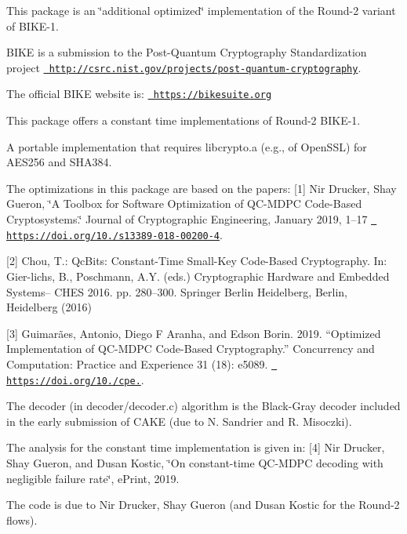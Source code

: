 This package is an \char`\"{}additional optimized\char`\"{} implementation of the Round-\/2 variant of BIKE-\/1.

BIKE is a submission to the Post-\/\+Quantum Cryptography Standardization project \href{http://csrc.nist.gov/projects/post-quantum-cryptography}{\texttt{ http\+://csrc.\+nist.\+gov/projects/post-\/quantum-\/cryptography}}.

The official BIKE website is\+: \href{https://bikesuite.org}{\texttt{ https\+://bikesuite.\+org}}

This package offers a constant time implementations of Round-\/2 BIKE-\/1.
\begin{DoxyItemize}
\item A portable implementation that requires libcrypto.\+a (e.\+g., of Open\+SSL) for AES256 and SHA384.
\end{DoxyItemize}

The optimizations in this package are based on the papers\+: \mbox{[}1\mbox{]} Nir Drucker, Shay Gueron, \char`\"{}\+A Toolbox for Software Optimization of QC-\/\+MDPC      Code-\/\+Based Cryptosystems.\char`\"{} Journal of Cryptographic Engineering, January 2019, 1–17 \href{https://doi.org/10.1007/s13389-018-00200-4}{\texttt{ https\+://doi.\+org/10./s13389-\/018-\/00200-\/4}}.

\mbox{[}2\mbox{]} Chou, T.\+: Qc\+Bits\+: Constant-\/\+Time Small-\/\+Key Code-\/\+Based Cryptography. In\+: Gier-\/lichs, B., Poschmann, A.\+Y. (eds.) Cryptographic Hardware and Embedded Systems– CHES 2016. pp. 280–300. Springer Berlin Heidelberg, Berlin, Heidelberg (2016)

\mbox{[}3\mbox{]} Guimarães, Antonio, Diego F Aranha, and Edson Borin. 2019. “\+Optimized Implementation of QC-\/\+MDPC Code-\/\+Based Cryptography.\+” Concurrency and Computation\+: Practice and Experience 31 (18)\+: e5089. \href{https://doi.org/10.1002/cpe.5089}{\texttt{ https\+://doi.\+org/10./cpe.}}.

The decoder (in decoder/decoder.\+c) algorithm is the Black-\/\+Gray decoder included in the early submission of CAKE (due to N. Sandrier and R. Misoczki).

The analysis for the constant time implementation is given in\+: \mbox{[}4\mbox{]} Nir Drucker, Shay Gueron, and Dusan Kostic, \char`\"{}\+On constant-\/time QC-\/\+MDPC decoding with negligible failure rate\char`\"{}, e\+Print, 2019.

The code is due to Nir Drucker, Shay Gueron (and Dusan Kostic for the Round-\/2 flows). 